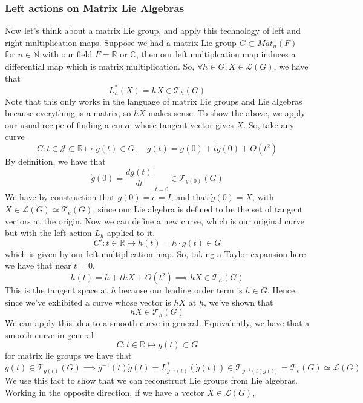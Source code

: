 \subsubsection{Left actions on Matrix Lie Algebras} 
Now let's think about a matrix Lie group, and apply this technology 
of left and right multiplication maps. Suppose we had a matrix 
Lie group $ G \subset Mat_n ( F) $ for  $ n \in \mathbb{ N } $ 
with our field $ F = \mathbb{ R} $ or  $ \mathbb{ C} $, 
then our left multiplcation map induces a differential map which is 
matrix multiplication. 
So,  $ \forall h \in G, X \in \mathcal{ L }( G ) $, we have that 
\[
	L^ * _ h  ( X ) = h X \in \mathcal{ T }_h ( G ) 
\]
Note that this only works in the language of matrix
Lie groups and Lie algebras because everything is a matrix, 
so $ h X $ makes sense. 
To show the above, we apply our usual recipe of finding a curve whose tangent
vector gives $ X $. So, take any curve 
\[
	 	C : t \in \mathcal{ J } \subset \mathbb{ R} \mapsto g ( t) \in G  , \quad g( t) = g( 0 ) + t \dot{g }( 0 ) + O ( t^ 2 )  
\] By definition, we have that 
\[
	\dot{ g }( 0 ) = \left. \frac{ dg ( t)  }{dt } \right\vert_{ t =0 } \in \mathcal{ T }_{ g ( 0 ) }( G )  
\]
We have by construction that $ g ( 0 ) = e = I $, and that $ \dot{g }( 0)  = X  $, with 
$ X \in \mathcal{ L } ( G ) \simeq \mathcal{ T }_e ( G )  $, since our Lie algebra is defined to be the set of tangent vectors at the origin. 
Now we can define a new curve, which is our original curve but 
with the left action $ L _ h  $  applied to it. 
\[
	C' : t \in \mathbb{ R} \mapsto h ( t) =  h \cdot g( t) \in G 
\] which is given by our left multiplication map. So, taking a Taylor 
expansion here we have that 
near $ t = 0$, 
\[
	h ( t) = h +  th X + O ( t^ 2) \implies h X \in \mathcal{ T }_ h ( G )  
\] This is the tangent space at $ h $ because our leading order 
term is $ h \in G$. Hence, since we've exhibited 
a curve whose vector is $ h X $ at $ h  $, we've shown that 
\[
	h X \in \mathcal{ T }_ h ( G) 
\] 
We can apply this idea to a smooth curve in general. 
Equivalently, we have that 
a smooth curve in general
\[
 C  : t \in \mathbb{ R} \mapsto g( t) \subset G 
\] for matrix lie groups we have that 
\[
	\dot{ g }( t) \in \mathcal{ T }_{ g ( t) } ( G ) \implies g ^{- 1} ( t) \dot{ g }( t)  = L ^ * _{ g ^{ -1 } ( t) } ( \dot{g }( t) ) \in \mathcal{ T }_{ g ^{ - 1  } ( t) g ( t) } =  \mathcal{ T } _ e ( G ) \simeq \mathcal{ L } ( G )   
\]
We use this fact to show that we 
can reconstruct Lie groups from Lie algebras. Working in the 
opposite direction, if we have a vector $ X \in \mathcal{ L } ( G ) $, 
